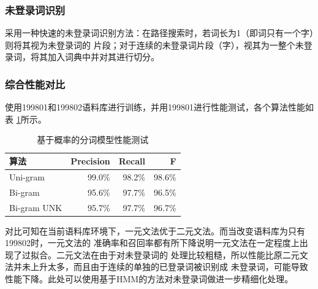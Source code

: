 \subsubsection{未登录词识别}

采用一种快速的未登录词识别方法：在路径搜索时，若词长为1（即词只有一个字）则将其视为未登录词的
片段；对于连续的未登录词片段（字），视其为一整个未登录词，将其加入词典中并对其进行切分。

\subsubsection{综合性能对比}

使用199801和199802语料库进行训练，并用199801进行性能测试，各个算法性能如表
\ref{seg_evaluate2}所示。

\begin{table}[H]
  \centering
  \begin{tabular}{lrrr}
    \hline
    \textbf{算法} & \textbf{Precision} & \textbf{Recall} & \textbf{F} \\
    \hline
    Uni-gram      & 99.0\%             & 98.2\%          & 98.6\%     \\
    Bi-gram       & 95.6\%             & 97.7\%          & 96.5\%     \\
    Bi-gram UNK   & 95.7\%             & 97.7\%          & 96.7\%     \\
    \hline
  \end{tabular}
  \caption{基于概率的分词模型性能测试}
  \label{seg_evaluate2}
\end{table}

对比可知在当前语料库环境下，一元文法优于二元文法。而当改变语料库为只有199802时，一元文法的
准确率和召回率都有所下降说明一元文法在一定程度上出现了过拟合。二元文法在由于对未登录词的
处理比较粗糙，所以性能比原二元文法并未上升太多，而且由于连续的单独的已登录词被识别成
未登录词，可能导致性能下降。此处可以使用基于HMM的方法对未登录词做进一步精细化处理。

